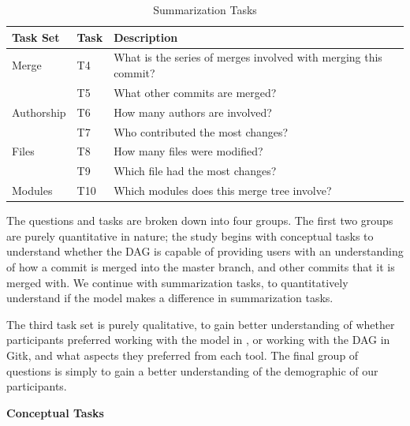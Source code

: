 \documentclass[draft]{IEEEtran}
\begin{document}
\begin{table}[htpb]
  \centering
  \caption{Summarization Tasks}
  \label{tab:summarization_tasks}
  \begin{tabulary}{\linewidth}{LLL}
    \toprule
    Task Set   & Task & Description\\\midrule
    Merge      & T4   & What is the series of merges involved with merging this
    commit?\\
               & T5   & What other commits are merged?\\
    Authorship & T6   & How many authors are involved?\\
               & T7   & Who contributed the most changes?\\
    Files      & T8   & How many files were modified?\\
               & T9   & Which file had the most changes?\\
    Modules    & T10  & Which modules does this merge tree involve?\\
    \bottomrule
  \end{tabulary}
\end{table}



The questions and tasks are broken down into four groups. The first two
groups are purely quantitative in nature; the study begins with
conceptual tasks to understand whether the DAG is capable of providing
users with an understanding of how a commit is merged into the master
branch, and other commits that it is merged with. We continue with
summarization tasks, to quantitatively understand if the \mt model makes
a difference in summarization tasks.

The third task set is purely qualitative,  to gain better understanding
of whether participants preferred working with the \mt model in \tool,
or working with the DAG in Gitk, and what aspects they preferred from
each tool. The final group of questions is simply to gain a better
understanding of the demographic of our participants.


\textbf{Conceptual Tasks}


\end{document}
